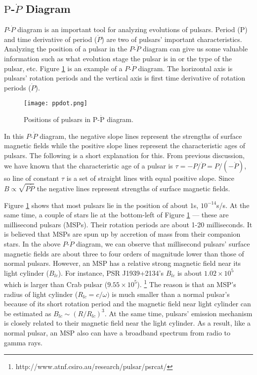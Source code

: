 \documentclass[a4paper, 12pt]{report}
\begin{document}
    \subsection{$\mbox{P}$-$\dot{P}$ Diagram} 
      $P$-$\dot{P}$ diagram is an important tool for analyzing evolutions of 
      pulsars. Period ($\mbox{P}$) and time derivative of period ($\dot{P}$) are 
      two of pulsars' important characteristics. Analyzing the position of a pulsar in 
      the $P$-$\dot{P}$ diagram can give us some valuable information such as 
      what evolution stage the pulsar is in or the type of the pulsar, etc. 
      Figure \ref{fig:p-pdot} is an example of a $P$-$\dot{P}$ diagram. 
      The horizontal axis is pulsars' rotation periods and the vertical axis is first time 
      derivative of rotation periods ($\dot{P}$).
      \begin{figure}[!htp]
          \centering
          \texttt{[image: ppdot.png]}
          \caption{\protect Positions of pulsars in $\mbox{P}$-$\dot{\mbox{P}}$ diagram.}
          \label{fig:p-pdot}
      \end{figure}
      In this $P$-$\dot{P}$ diagram, the negative slope lines represent the strengths 
      of surface magnetic fields while the positive slope lines represent the characteristic 
      ages of pulsars. The following is a short explanation for this. 
      From previous discussion, we have known that the 
      characteristic age of a pulsar is $\tau=-P/\dot{P}=P/(-\dot{P})$, so line of constant 
      $\tau$ is a set of straight lines with equal positive slope. Since 
      $B\propto\sqrt{P\dot{P}}$ the negative lines represent strengths of surface 
      magnetic fields.

      Figure \ref{fig:p-pdot} shows that most pulsars lie in the position of about 
      $1$s, $10^{-14}$s/s. At the same time, a couple of stars lie at the bottom-left 
      of Figure \ref{fig:p-pdot} --- these are millisecond pulsars (MSPs). Their 
      rotation periods are about 1-20 milliseconds. It is believed that MSPs are spun 
      up by accretion of mass from their companion stars. In the above 
      $P$-$\dot{P}$ diagram, we can observe that millisecond pulsars' 
      surface magnetic fields are about three to four orders of magnitude lower than those
      of normal pulsars. However, an MSP has a relative strong magnetic field near its 
      light cylinder ($B_{lc}$). For instance, PSR J1939+2134's $B_{lc}$ is about 
      $1.02\times10^5$ which is larger than Crab pulsar ($9.55\times10^5$). 
      \footnote{http://www.atnf.csiro.au/research/pulsar/psrcat/}
      The reason is that an MSP's radius 
      of light cylinder ($R_{lc}=c/\omega)$ is much smaller than a normal pulsar's 
      because of its short rotation period and the magnetic field near light cylinder can
      be estimated as $B_{lc}\sim\left(R/R_{lc}\right)^3$. At the same time, 
      pulsars' emission mechanism is closely related to their magnetic field near the light 
      cylinder. As a result, like a normal pulsar, an MSP also can have a broadband spectrum 
      from radio to gamma rays. 
\end{document}
